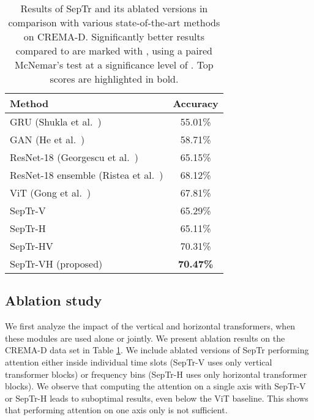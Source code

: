 \documentclass[a4paper]{article}
\begin{document}
\begin{table}[!t]
\caption{Results of SepTr and its ablated versions in comparison with various state-of-the-art methods on CREMA-D. Significantly better results compared to \cite{Ristea-INTERSPEECH-2021} are marked with , using a paired McNemar's test \cite{Dietterich-NC-1998} at a significance level of . Top scores are highlighted in bold.}
\label{tab_results_cremad}
\vspace{-0.2cm}
\centering
\begin{tabular}{l c}
\toprule
{\textbf{Method}} & {\textbf{Accuracy}}\\
\midrule
GRU (Shukla et al.~\cite{Shukla-ICASSP-2020}) & 55.01\% \\
GAN (He et al.~\cite{He-CVPRW-2020}) & 58.71\% \\
ResNet-18 (Georgescu et al.~\cite{georgescu2020non}) & 65.15\% \\
ResNet-18 ensemble (Ristea et al.~\cite{Ristea-INTERSPEECH-2021}) & 68.12\% \\
ViT (Gong et al.~\cite{Gong-INTERSPEECH-2021})  & 67.81\% \\
\midrule
SepTr-V         & 65.29\% \\
SepTr-H         & 65.11\% \\
\midrule
SepTr-HV         & 70.31\% \\
SepTr-VH (proposed)        & \textbf{70.47\%} \\
\bottomrule
\end{tabular}
\vspace{-0.1cm}
\end{table}


\subsection{Ablation study}

We first analyze the impact of the vertical and horizontal transformers, when these modules are used alone or jointly. We present ablation results on the CREMA-D data set in Table \ref{tab_results_cremad}. We include ablated versions of SepTr performing attention either inside individual time slots (SepTr-V uses only vertical transformer blocks) or frequency bins (SepTr-H uses only horizontal transformer blocks). We observe that computing the attention on a single axis with SepTr-V or SepTr-H leads to suboptimal results, even below the ViT baseline. This shows that performing attention on one axis only is not sufficient.
\end{document}
